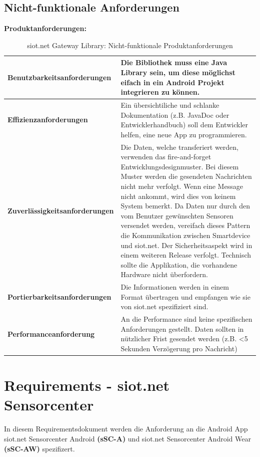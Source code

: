 \subsection{Nicht-funktionale Anforderungen}
\textbf{Produktanforderungen:}
\begin{table}[H]
\centering
\begin{tabular}{|>{\columncolor[gray]{0.8}}p{5cm}|p{11.5cm}|}
\hline
\textbf{Benutzbarkeitsanforderungen}    & Die Bibliothek muss eine Java Library sein, um diese möglichst eifach in ein Android Projekt integrieren zu können. \\ \hline
\textbf{Effizienzanforderungen}         & Ein übersichtiliche und schlanke Dokumentation (z.B. JavaDoc oder Entwicklerhandbuch) soll dem Entwickler helfen, eine neue App zu programmieren. \\ \hline
\textbf{Zuverlässigkeitsanforderungen}  & Die Daten, welche transferiert werden, verwenden das fire-and-forget Entwicklungsdesignmuster. Bei diesem Muster werden die gesendeten Nachrichten nicht mehr verfolgt. Wenn eine Message nicht ankommt, wird dies von keinem System bemerkt. Da Daten nur durch den vom Benutzer gewünschten Sensoren versendet werden, vereifach dieses Pattern die Kommunikation zwischen Smartdevice und siot.net. Der Sicherheitsaspekt wird in einem weiteren Release verfolgt. Technisch sollte die Applikation, die vorhandene Hardware nicht überfordern. \\ \hline
\textbf{Portierbarkeitsanforderungen}   & Die Informationen werden in einem Format übertragen und empfangen wie sie von siot.net spezifiziert sind. \\ \hline
\textbf{Performanceanforderung}         & An die Performance sind keine spezifischen Anforderungen gestellt. Daten sollten in nützlicher Frist gesendet werden {(z.B. <5 Sekunden Verzögerung pro Nachricht)} \\ \hline
\end{tabular}
\caption{siot.net Gateway Library: Nicht-funktionale Produktanforderungen}
\end{table}

\newpage

\section{Requirements - siot.net Sensorcenter}
In diesem Requirementsdokument werden die Anforderung an die Android App siot.net Sensorcenter Android \textbf{(sSC-A)} und siot.net Sensorcenter Android Wear \textbf{(sSC-AW)} spezifizert.
